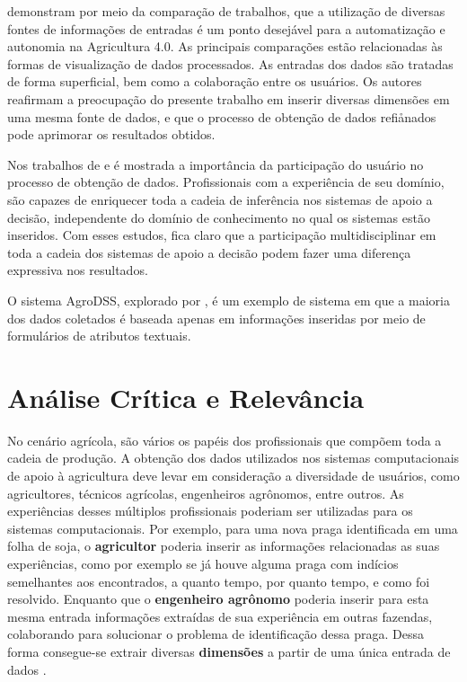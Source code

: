  demonstram por meio da comparação de trabalhos, que a utilização de diversas fontes de informações de entradas é um ponto desejável para a automatização e autonomia na Agricultura 4.0. As principais comparações estão relacionadas às formas de visualização de dados processados. As entradas dos dados são tratadas de forma superficial, bem como a colaboração entre os usuários. Os autores reafirmam a preocupação do presente trabalho em inserir diversas dimensões em uma mesma fonte de dados, e que o processo de obtenção de dados refiånados pode aprimorar os resultados obtidos.

Nos trabalhos de  e  é mostrada a importância da participação do usuário no processo de obtenção de dados. Profissionais com a experiência de seu domínio, são capazes de enriquecer toda a cadeia de inferência nos sistemas de apoio a decisão, independente do domínio de conhecimento no qual os sistemas estão inseridos. Com esses estudos, fica claro que a participação multidisciplinar em toda a cadeia dos sistemas de apoio a decisão podem fazer uma diferença expressiva nos resultados.

O sistema AgroDSS, explorado por , é um exemplo de sistema em que a maioria dos dados coletados é baseada apenas em informações inseridas por meio de formulários de atributos textuais.

\section{Análise Crítica e Relevância}
\label{sec:analise_critica_relevancia}

No cenário agrícola, são vários os papéis dos profissionais que compõem toda a cadeia de produção. A obtenção dos dados utilizados nos sistemas computacionais de apoio à agricultura deve levar em consideração a diversidade de usuários, como agricultores, técnicos agrícolas, engenheiros agrônomos, entre outros. As experiências desses múltiplos profissionais poderiam ser utilizadas para os sistemas computacionais. Por exemplo, para uma nova praga identificada em uma folha de soja, o \textbf{agricultor} poderia inserir as informações relacionadas as suas experiências, como por exemplo se já houve alguma praga com indícios semelhantes aos encontrados, a quanto tempo, por quanto tempo, e como foi resolvido. Enquanto que o \textbf{engenheiro agrônomo} poderia inserir para esta mesma entrada informações extraídas de sua experiência em outras fazendas, colaborando para solucionar o problema de identificação dessa praga. Dessa forma consegue-se extrair diversas \textbf{dimensões} a partir de uma única entrada de dados \cite{Walling:2020}.

